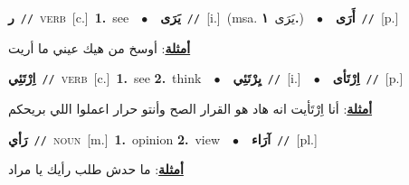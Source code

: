 \documentclass[10pt,a4paper,twoside]{article} %
\begin{document}
\begin{multicols}{2}
{{{{{\setlength\topsep{0pt}\textbf{\foreignlanguage{arabic}{ر}}\ {\color{gray}\texttt{//}\color{black}}\ \textsc{verb}\ [c.]\ \textbf{1.}~see\ \ $\bullet$\ \ \setlength\topsep{0pt}\textbf{\foreignlanguage{arabic}{يَرَى}}\ {\color{gray}\texttt{//}\color{black}}\ [i.]\ \color{gray}(msa. \foreignlanguage{arabic}{يَرَى}~\foreignlanguage{arabic}{\textbf{١.}})\color{black}\ \ $\bullet$\ \ \setlength\topsep{0pt}\textbf{\foreignlanguage{arabic}{أَرَى}}\ {\color{gray}\texttt{//}\color{black}}\ [p.]\  \begin{flushright}\color{gray}\foreignlanguage{arabic}{\textbf{\underline{\foreignlanguage{arabic}{أمثلة}}}: أوسخ من هيك عيني ما أريت}\end{flushright}\color{black}} \vspace{2mm}

{\setlength\topsep{0pt}\textbf{\foreignlanguage{arabic}{اِرْتَئِي}}\ {\color{gray}\texttt{//}\color{black}}\ \textsc{verb}\ [c.]\ \textbf{1.}~see  \textbf{2.}~think\ \ $\bullet$\ \ \setlength\topsep{0pt}\textbf{\foreignlanguage{arabic}{يِرْتَئِي}}\ {\color{gray}\texttt{//}\color{black}}\ [i.]\ \ $\bullet$\ \ \setlength\topsep{0pt}\textbf{\foreignlanguage{arabic}{اِرْتَأى}}\ {\color{gray}\texttt{//}\color{black}}\ [p.]\  \begin{flushright}\color{gray}\foreignlanguage{arabic}{\textbf{\underline{\foreignlanguage{arabic}{أمثلة}}}: أنا اِرْتَأيت انه هاد هو القرار الصح وأنتو حرار اعملوا اللي بريحكم}\end{flushright}\color{black}} \vspace{2mm}

{\setlength\topsep{0pt}\textbf{\foreignlanguage{arabic}{رَأي}}\ {\color{gray}\texttt{//}\color{black}}\ \textsc{noun}\ [m.]\ \textbf{1.}~opinion  \textbf{2.}~view\ \ $\bullet$\ \ \setlength\topsep{0pt}\textbf{\foreignlanguage{arabic}{آرَاء}}\ {\color{gray}\texttt{//}\color{black}}\ [pl.]\  \begin{flushright}\color{gray}\foreignlanguage{arabic}{\textbf{\underline{\foreignlanguage{arabic}{أمثلة}}}: ما حدش طلب رأيك يا مراد}\end{flushright}\color{black}} \vspace{2mm}

}}}}
\end{multicols}
\end{document}
